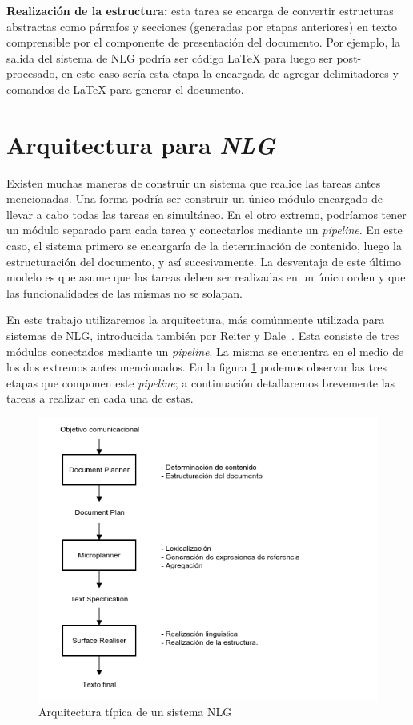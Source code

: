 \bigskip
\noindent
\textbf{Realización de la estructura:} esta tarea se encarga de convertir estructuras abstractas como párrafos y secciones (generadas por etapas anteriores) en texto comprensible por el componente de presentación del documento. Por ejemplo, la salida del sistema de NLG podría ser código LaTeX para luego ser post-procesado, en este caso sería esta etapa la encargada de agregar delimitadores y comandos de LaTeX para generar el documento. 

\section{Arquitectura para \textit{NLG}}
Existen muchas maneras de construir un sistema que realice las tareas antes mencionadas. Una forma podría ser construir un único módulo encargado de llevar a cabo todas las tareas en simultáneo. En el otro extremo, podríamos tener un módulo separado para cada tarea y conectarlos mediante un \emph{pipeline}. En este caso, el sistema primero se encargaría de la determinación de contenido, luego la estructuración del documento, y así sucesivamente. La desventaja de este último modelo es que asume que las tareas deben ser realizadas en un único orden y que las funcionalidades de las mismas no se solapan.

En este trabajo utilizaremos la arquitectura, más comúnmente utilizada para sistemas de NLG, introducida también por Reiter y Dale~\cite{reiter_dale}. Esta consiste de tres módulos conectados mediante un \emph{pipeline}. La misma se encuentra en el medio de los dos extremos antes mencionados. En la figura \ref{fig:png_arquitectura} podemos observar las tres etapas que componen este \emph{pipeline}; a continuación detallaremos brevemente las tareas a realizar en cada una de estas.

\begin{figure}[h]
  	\centering
	\includegraphics[scale=0.6]{img/arquitectura.png}
	\caption{Arquitectura típica de un sistema NLG}
  	\label{fig:png_arquitectura}
\end{figure}

